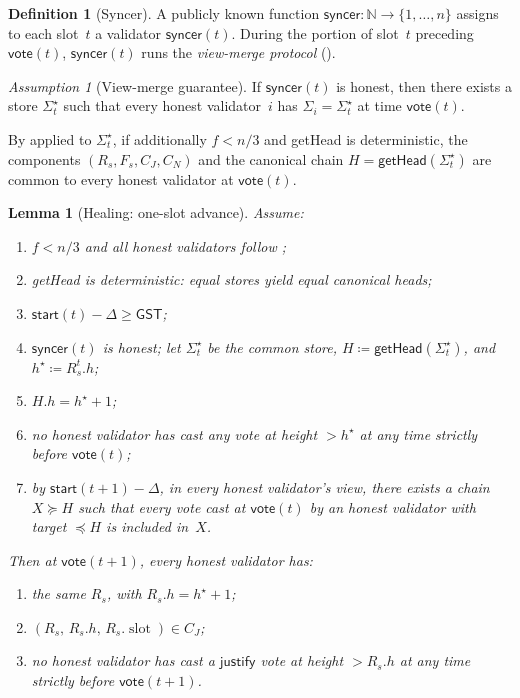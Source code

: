 \documentclass{article}
\newcommand{\slot}[0]{\ensuremath{\operatorname{\mathrm{slot}}}}
\newcommand{\just}{\ensuremath{\mathsf{justify}}\xspace}
\newcommand{\syncer}{\mathsf{syncer}}
\newcommand{\start}{\mathsf{start}}
\newcommand{\vote}{\mathsf{vote}}
\newcommand{\getHead}{\textsf{getHead}\xspace}
\theoremstyle{plain}
\newtheorem{lemma}{Lemma}
\theoremstyle{definition}
\newtheorem{definition}[theorem]{Definition}
\theoremstyle{remark}
\newtheorem{assumption}[theorem]{Assumption}
\newcommand{\GST}{\ensuremath{\mathsf{GST}}}
\begin{document}
\begin{definition}[Syncer]\label{rev:def:syncer}
A publicly known function $\syncer \colon \mathbb{N} \to \{1, \ldots, n\}$ assigns to each slot~$t$ a validator $\syncer(t)$.
During the portion of slot~$t$ preceding $\vote(t)$, $\syncer(t)$ runs the \emph{view-merge protocol} ().
\end{definition}

\begin{assumption}[View-merge guarantee]\label{rev:ass:view-merge}
If $\syncer(t)$ is honest, then there exists a store $\Sigma^\star_t$ such that every honest validator~$i$ has $\Sigma_i = \Sigma^\star_t$ at time $\vote(t)$.
\end{assumption}

By  applied to $\Sigma^\star_t$, if additionally $f < n/3$ and \getHead is deterministic, the components $(R_s, F_s, C_J, C_N)$ and the canonical chain $H = \getHead(\Sigma^\star_t)$ are common to every honest validator at $\vote(t)$.

\begin{lemma}[Healing: one-slot advance]\label{rev:lem:healing-one-slot}
Assume:
\begin{enumerate}
  \item $f < n/3$ and all honest validators follow ;
  \item \getHead is deterministic: equal stores yield equal canonical heads;
  \item $\start(t) - \Delta \geq \GST$;
  \item $\syncer(t)$ is honest; let $\Sigma^\star_t$ be the common store, $H \coloneqq \getHead(\Sigma^\star_t)$, and $h^\star \coloneqq R_s^t.h$;
  \item $H.h = h^\star + 1$;
  \item no honest validator has cast any vote at height $> h^\star$ at any time strictly before $\vote(t)$;
  \item by $\start(t+1) - \Delta$, in every honest validator's view, there exists a chain $X \succeq H$ such that every vote cast at $\vote(t)$ by an honest validator with target $\preceq H$ is included in~$X$.
\end{enumerate}
Then at $\vote(t+1)$, every honest validator has:
\begin{enumerate}
  \item the same $R_s$, with $R_s.h = h^\star + 1$;
  \item $(R_s,\, R_s.h,\, R_s.\slot) \in C_J$;
  \item no honest validator has cast a \just vote at height $> R_s.h$ at any time strictly before $\vote(t+1)$.
\end{enumerate}
\end{lemma}
\end{document}
